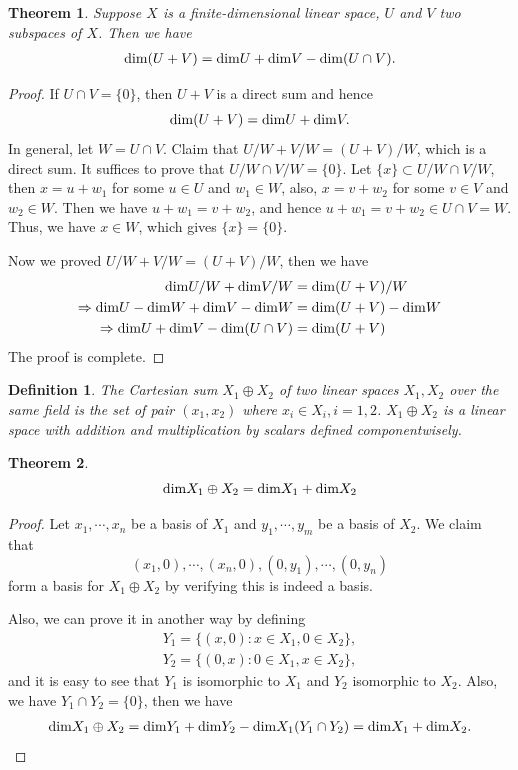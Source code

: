 \documentclass[11pt]{book}
\newtheorem{definition}{Definition}[section]
\newtheorem{theorem}{Theorem}[section]
\theoremstyle{definition}
\numberwithin{equation}{chapter}
\begin{document}
\medskip

\begin{theorem}
Suppose $X$ is a finite-dimensional linear space, $U$ and $V$ two subspaces of $X$. Then we have
\begin{align*}
    {\rm dim}(U+V) = {\rm dim}U + {\rm dim}V - {\rm dim}(U\cap V).
\end{align*}
\end{theorem}
\begin{proof}
If $U\cap V = \{0\}$, then $U+V$ is a direct sum and hence 
$${\rm dim}(U+V) = {\rm dim}U + {\rm dim}V.$$
In general, let $W = U\cap V$. Claim that $U/W+V/W = (U+V)/W$, which is a direct sum. It suffices to prove that $U/W\cap V/W = \{0\}$. Let $\{x\}\subset U/W\cap V/W$, then $x = u+w_1$ for some $u\in U$ and $w_1\in W$, also, $x = v+w_2$ for some $v\in V$ and $w_2\in W$. Then we have $u+w_1 = v+w_2$, and hence $u+w_1 = v+w_2\in U\cap V = W$. Thus, we have $x\in W$, which gives $\{x\} = \{0\}$.

Now we proved $U/W+V/W = (U+V)/W$, then we have 
\begin{align*}
    {\rm dim}U/W + {\rm dim}V/W & = {\rm dim}(U+V)/W \\
    \Rightarrow {\rm dim}U - {\rm dim} W + {\rm dim} V - {\rm dim}W & = {\rm dim}(U+V) - {\rm dim}W\\ 
    \Rightarrow {\rm dim}U + {\rm dim} V - {\rm dim}(U\cap V) & = {\rm dim}(U+V)
\end{align*}
The proof is complete.
\end{proof}

\medskip

\begin{definition}
The Cartesian sum $X_1\oplus X_2$ of two linear spaces $X_1, X_2$ over the same field is the set of pair $(x_1,x_2)$ where $x_i\in X_i, i = 1,2$. $X_1\oplus X_2$ is a linear space with addition and multiplication by scalars defined componentwisely. 
\end{definition}

\medskip

\begin{theorem}
$${\rm dim}X_1\oplus X_2 = {\rm dim}X_1 + {\rm dim}X_2$$
\end{theorem}
\begin{proof}
Let $x_1, \cdots, x_n$ be a basis of $X_1$ and $y_1, \cdots, y_m$ be a basis of $X_2$. We claim that 
$$(x_1,0),\cdots, (x_n,0), (0,y_1), \cdots, (0,y_n)$$ 
form a basis for $X_1\oplus X_2$ by verifying this is indeed a basis.

Also, we can prove it in another way by defining
\begin{align*}
    Y_1 = \{(x,0): x\in X_1, 0\in X_2\}, \\
    Y_2 = \{(0,x): 0\in X_1, x\in X_2\},
\end{align*}
and it is easy to see that $Y_1$ is isomorphic to $X_1$ and $Y_2$ isomorphic to $X_2$. Also, we have $Y_1\cap Y_2 = \{0\}$, then we have 
\begin{align*}
    {\rm dim}X_1\oplus X_2 = {\rm dim}Y_1 + {\rm dim}Y_2 - {\rm dim}X_1(Y_1\cap Y_2) = {\rm dim}X_1 + {\rm dim}X_2.
\end{align*}
\end{proof}
\end{document}

